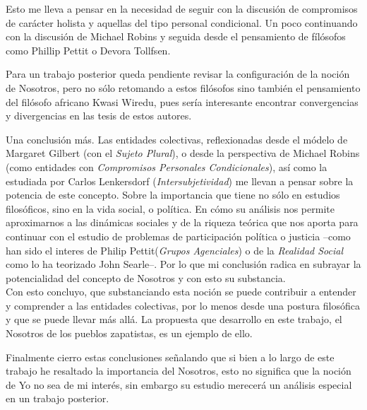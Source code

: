 \documentclass[oneside]{book}
\begin{document}
Esto me lleva a pensar en la necesidad de seguir con la discusión de compromisos de carácter holista y aquellas del tipo personal condicional. Un poco continuando con la discusión de Michael Robins y seguida desde el pensamiento de fílósofos como Phillip Pettit\cite{pettit} o Devora Tollfsen\cite{Dev}. 

Para un trabajo posterior queda pendiente revisar la configuración de la noción de Nosotros, pero no sólo retomando a estos filósofos sino también el pensamiento del filósofo africano Kwasi Wiredu, pues sería interesante encontrar convergencias y divergencias en las tesis de estos autores. 

Una conclusión más. Las entidades colectivas, reflexionadas desde el módelo de Margaret Gilbert (con el \textit{Sujeto Plural}), o desde la perspectiva de Michael Robins (como entidades con \textit{Compromisos Personales Condicionales}), así como la estudiada por Carlos Lenkersdorf (\textit{Intersubjetividad}) me llevan a pensar sobre la potencia de este concepto. Sobre la importancia que tiene no sólo en estudios filosóficos, sino en la vida social, o política. En cómo su análisis nos permite aproximarnos a las dinámicas sociales y de la riqueza teórica que nos aporta para continuar con el estudio de problemas de participación política o justicia --como han sido el interes de Philip Pettit(\textit{Grupos Agenciales}) o de la \textit{Realidad Social} como lo ha teorizado John Searle--. Por lo que mi conclusión radica en subrayar la potencialidad del concepto de Nosotros y con esto su substancia.
\\

Con esto concluyo, que substanciando esta noción se puede contribuir a entender y comprender a las entidades colectivas, por lo menos desde una postura filosófica y que se puede llevar más allá. La propuesta que desarrollo en este trabajo, el Nosotros de los pueblos zapatistas, es un ejemplo de ello.

Finalmente cierro estas conclusiones señalando que si bien a lo largo de este trabajo he resaltado la importancia del Nosotros, esto no significa que la noción de Yo no sea de mi interés, sin embargo su estudio merecerá un análisis especial en un trabajo posterior.
\end{document}
